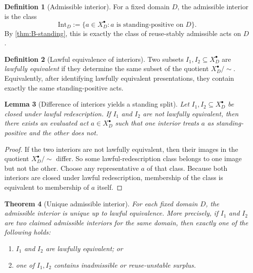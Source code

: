 \documentclass[11pt]{article}
\theoremstyle{plain}
\newtheorem{theorem}{Theorem}[section]
\newtheorem{lemma}[theorem]{Lemma}
\theoremstyle{definition}
\newtheorem{definition}[theorem]{Definition}
\newcommand{\IntD}{\mathrm{Int}}
\newcommand{\Law}{\sim}
\newcommand{\Eval}{X_D^{\bullet}}
\newcommand{\domain}{D}
\begin{document}
\begin{definition}[Admissible interior]
For a fixed domain $\domain$, the admissible interior is the class
\[
\IntD_\domain:=\{a\in\Eval : a \text{ is standing-positive on } \domain\}.
\]
By \cref{thm:B-standing}, this is exactly the class of reuse-stably admissible acts on $\domain$.
\end{definition}

\begin{definition}[Lawful equivalence of interiors]
Two subsets $I_1,I_2\subseteq \Eval$ are \emph{lawfully equivalent} if they determine the same subset of the quotient $\Eval/\Law$. Equivalently, after identifying lawfully equivalent presentations, they contain exactly the same standing-positive acts.
\end{definition}

\begin{lemma}[Difference of interiors yields a standing split]
\label{lem:B-interior-split}
Let $I_1,I_2\subseteq \Eval$ be closed under lawful redescription. If $I_1$ and $I_2$ are not lawfully equivalent, then there exists an evaluated act $a\in\Eval$ such that one interior treats $a$ as standing-positive and the other does not.
\end{lemma}

\begin{proof}
If the two interiors are not lawfully equivalent, then their images in the quotient $\Eval/\Law$ differ. So some lawful-redescription class belongs to one image but not the other. Choose any representative $a$ of that class. Because both interiors are closed under lawful redescription, membership of the class is equivalent to membership of $a$ itself.
\end{proof}

\begin{theorem}[Unique admissible interior]
\label{thm:B-interior-unique}
For each fixed domain $\domain$, the admissible interior is unique up to lawful equivalence. More precisely, if $I_1$ and $I_2$ are two claimed admissible interiors for the same domain, then exactly one of the following holds:
\begin{enumerate}[label=(\alph*), leftmargin=2.5em]
    \item $I_1$ and $I_2$ are lawfully equivalent; or
    \item one of $I_1,I_2$ contains inadmissible or reuse-unstable surplus.
\end{enumerate}
\end{theorem}
\end{document}
